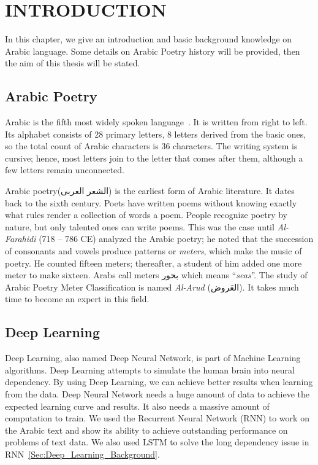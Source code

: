 \chapter{\uppercase{Introduction}}\label{Ch:Intro}
In this chapter, we give an introduction and basic background knowledge on Arabic language. Some details on Arabic Poetry history will be provided, then the aim of this thesis will be stated.

\section{Arabic Poetry } %
Arabic is the fifth most widely spoken language~\cite{Ethnologue_2017}. It is written from right to left. Its alphabet consists of 28 primary letters, 8 letters derived from the basic ones, so the total count of Arabic characters is 36 characters. The writing system is cursive; hence, most letters join to the letter that comes after them, although a few letters remain unconnected.

Arabic poetry(\textarabic{الشعر العربى}) is the earliest form of Arabic literature. It dates back to the sixth century. Poets have written poems without knowing exactly what rules render a collection of words a poem. People recognize poetry by nature, but only talented ones can write poems. This was the case until \textit{Al-Farahidi} (718 – 786 CE) analyzed the Arabic poetry; he noted that the succession of consonants and vowels produce patterns or \textit{meters}, which make the music of poetry. He counted fifteen meters; thereafter, a student of him added one more meter to make sixteen. Arabs call meters \textarabic{بحور} which means ``\textit{seas}''. The study of Arabic Poetry Meter Classification is named \textit{Al-Arud} (\textarabic{العَروض}). It takes much time to become an expert in this field. 
\section{Deep Learning}

Deep Learning, also named Deep Neural Network, is part of Machine Learning algorithms. Deep Learning attempts to simulate the human brain into neural dependency.  By using Deep Learning, we can achieve better results when learning from the data. Deep Neural Network needs a huge amount of data to achieve the expected learning curve and results. It also needs a massive amount of computation to train. We used the Recurrent Neural Network (RNN) to work on the Arabic text and show its ability to achieve outstanding performance on problems of text data. We also used LSTM to solve the long dependency issue in RNN~\ref{Sec:Deep_Learning_Background}.

